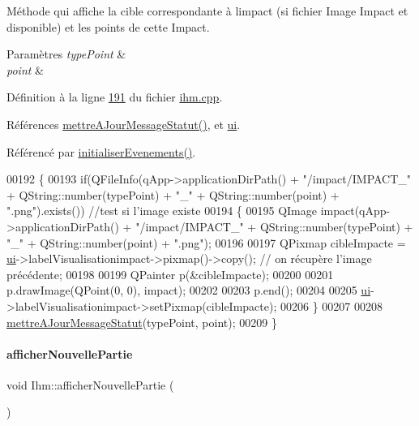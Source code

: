 Méthode qui affiche la cible correspondante à l\textquotesingle{}impact (si fichier Image Impact et disponible) et les points de cette Impact. 


\begin{DoxyParams}{Paramètres}
{\em type\+Point} & \\
\hline
{\em point} & \\
\hline
\end{DoxyParams}


Définition à la ligne \hyperlink{ihm_8cpp_source_l00191}{191} du fichier \hyperlink{ihm_8cpp_source}{ihm.\+cpp}.



Références \hyperlink{ihm_8cpp_source_l00218}{mettre\+A\+Jour\+Message\+Statut()}, et \hyperlink{ihm_8h_source_l00052}{ui}.



Référencé par \hyperlink{ihm_8cpp_source_l00075}{initialiser\+Evenements()}.


\begin{DoxyCode}
00192 \{
00193     \textcolor{keywordflow}{if}(QFileInfo(qApp->applicationDirPath() + \textcolor{stringliteral}{"/impact/IMPACT\_"} + QString::number(typePoint) + \textcolor{stringliteral}{"\_"} + 
      QString::number(point) + \textcolor{stringliteral}{".png"}).exists())       \textcolor{comment}{//test si l'image existe}
00194     \{
00195         QImage impact(qApp->applicationDirPath() + \textcolor{stringliteral}{"/impact/IMPACT\_"} + QString::number(typePoint) + \textcolor{stringliteral}{"\_"} + 
      QString::number(point) + \textcolor{stringliteral}{".png"});
00196 
00197         QPixmap cibleImpacte = \hyperlink{class_ihm_a0ac5f47856566ceeeca1720109bf70ea}{ui}->labelVisualisationimpact->pixmap()->copy(); \textcolor{comment}{// on récupère l'image
       précédente;}
00198 
00199         QPainter p(&cibleImpacte);
00200 
00201         p.drawImage(QPoint(0, 0), impact);
00202 
00203         p.end();
00204 
00205         \hyperlink{class_ihm_a0ac5f47856566ceeeca1720109bf70ea}{ui}->labelVisualisationimpact->setPixmap(cibleImpacte);
00206     \}
00207 
00208     \hyperlink{class_ihm_ab80e655c95fca8e1113343bdbd3d3586}{mettreAJourMessageStatut}(typePoint, point);
00209 \}
\end{DoxyCode}
\mbox{\label{class_ihm_a90c6b5c75d3903f50ea7c00b8093c686}} 
\paragraph{\texorpdfstring{afficher\+Nouvelle\+Partie}{afficherNouvellePartie}}
{\footnotesize\ttfamily void Ihm\+::afficher\+Nouvelle\+Partie (\begin{DoxyParamCaption}{ }\end{DoxyParamCaption})\hspace{0.3cm}{\ttfamily [slot]}}



